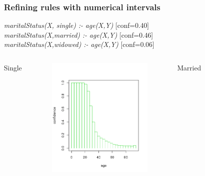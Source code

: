 \documentclass{beamer}
\begin{document}
\begin{frame}
\frametitle{Refining rules with numerical intervals}
 \emph{maritalStatus(X, single) :- age(X,Y)} [conf=0.40]\\
 \emph{maritalStatus(X,married) :- age(X,Y)} [conf=0.46]\\
 \emph{maritalStatus(X,widowed) :- age(X,Y)} [conf=0.06]
 \begin{columns}[c]
      \center Single
      \begin{figure}
      \includegraphics[width=1\linewidth]{./Figures/age-single.png}
      \end{figure}
      \center Married
      \begin{figure}

\end{figure}
\end{columns}
\end{frame}
\end{document}
